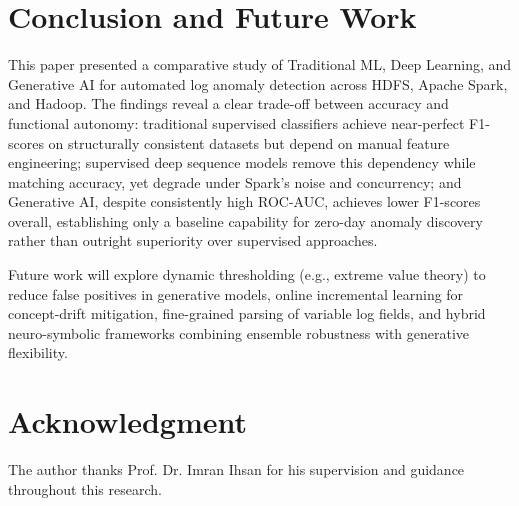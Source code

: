 \documentclass[conference]{IEEEtran}
\begin{document}
\section{Conclusion and Future Work}
This paper presented a comparative study of Traditional ML, Deep Learning, and Generative AI for automated log anomaly detection across HDFS, Apache Spark, and Hadoop. The findings reveal a clear trade-off between accuracy and functional autonomy: traditional supervised classifiers achieve near-perfect F1-scores on structurally consistent datasets but depend on manual feature engineering; supervised deep sequence models remove this dependency while matching accuracy, yet degrade under Spark's noise and concurrency; and Generative AI, despite consistently high ROC-AUC, achieves lower F1-scores overall, establishing only a baseline capability for zero-day anomaly discovery rather than outright superiority over supervised approaches.

Future work will explore dynamic thresholding (e.g., extreme value theory) to reduce false positives in generative models, online incremental learning for concept-drift mitigation, fine-grained parsing of variable log fields, and hybrid neuro-symbolic frameworks combining ensemble robustness with generative flexibility.

\section*{Acknowledgment}
The author thanks Prof. Dr. Imran Ihsan for his supervision and guidance throughout this research.
\end{document}

